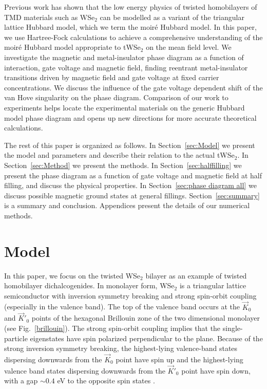 \documentclass[%
reprint,
superscriptaddress,
twocolumn,
 amsmath,amssymb,
 aps,
 prb,
]{revtex4-2}
\newcommand{\twsetwo}{tWSe$_2$}
\begin{document}
Previous work \cite{wu2018hubbard,PhysRevResearch.2.033087,tang2020simulation,Wang:2020us,pan2020quantum,pan2020interactiondriven} has shown that the low energy physics of twisted homobilayers of TMD materials such as WSe$_2$ can be modelled as a variant of the triangular lattice Hubbard model, which we term the moir\'e Hubbard model. In this paper, we use Hartree-Fock calculations to achieve a comprehensive understanding of the moir\'e Hubbard model appropriate to tWSe$_2$  on the mean field level. We investigate the magnetic and metal-insulator phase diagram as a function of interaction, gate voltage and magnetic field, finding reentrant metal-insulator transitions driven by magnetic field and gate voltage at fixed carrier concentrations. We discuss the influence of the gate voltage dependent shift of the van Hove singularity on the phase diagram. Comparison of our work to experiments helps locate the experimental materials on the generic  Hubbard model phase diagram and opens up new directions for more accurate theoretical calculations.  

The rest of this paper is organized as follows. In Section~\ref{sec:Model} we present the model and parameters and describe their relation to the actual \twsetwo. In Section~\ref{sec:Method} we present the methods. In Section~\ref{sec:halffilling} we present the phase diagram as a function of gate voltage and magnetic field at half filling, and discuss the physical properties. In Section~\ref{sec:phase diagram all} we discuss possible magnetic ground states at general fillings. Section~\ref{sec:summary} is a summary and conclusion. Appendices present the details of our numerical methods. 

\section{Model \label{sec:Model}}
In this paper, we focus on the twisted WSe$_2$ bilayer as an example of twisted homobilayer dichalcogenides.  In monolayer form, WSe$_2$ is a triangular lattice  semiconductor with inversion symmetry breaking and strong spin-orbit coupling (especially in the valence band). The top of the valence band occurs at the $\vec K_0$ and $\vec K'_0$ points of the  hexagonal Brillouin zone of the two dimensional monolayer (see Fig.~\ref{brillouin}). The strong spin-orbit coupling implies that the single-particle eigenstates have spin polarized perpendicular to the plane. Because of the strong inversion symmetry breaking, the highest-lying valence-band states dispersing downwards from the $\vec K_0$ point have spin up and the highest-lying valence band states dispersing downwards from the $\vec K'_0$ point have spin down, with a gap $\sim 0.4$ eV to the opposite spin states \cite{liu2013three}. 
\end{document}
